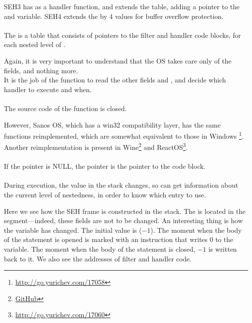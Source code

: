 SEH3 has  
as a handler function, and extends the  table, adding
a pointer to the  and  variable.
SEH4 extends the  
by 4 values for buffer overflow protection.\\
\\
The  is a table that consists of pointers to the filter and handler code blocks, for each nested level of .



Again, it is very important to understand that the \ac{OS} takes care only of the  fields, and nothing more.\\
It is the job of the  function to read the other fields and , and decide
which handler to execute and when.\\
\\
The source code of the  function is closed.

However, Sanos OS, which has a win32 compatibility layer, has the same
functions reimplemented, which are somewhat equivalent to those in Windows
\footnote{\url{http://go.yurichev.com/17058}}.
Another reimplementation is present in 
Wine\footnote{\href{http://go.yurichev.com/17059}{GitHub}}
and ReactOS\footnote{\url{http://go.yurichev.com/17060}}.\\
\\
If the  pointer is NULL, the  
pointer is the pointer to the  code block.\\
\\
During execution, the  value in the stack changes, so
 can get information about the current level of nestedness, 
in order to know which  entry to use.






Here we see how the SEH frame is constructed in the stack.
The  is located in the  segment---indeed, these fields are not to be changed.
An interesting thing is how the  variable has changed.
The initial value is  ($-1$).
The moment when the body of the  
statement is opened is marked with an instruction that writes 0 to the variable.
The moment when the body of the  statement is closed, $-1$ 
is written back to it.
We also see the addresses of filter and handler code.

